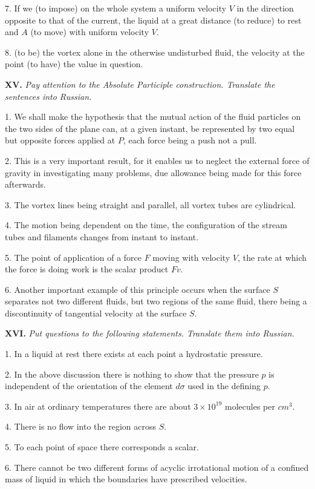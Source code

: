 \documentclass[a4paper]{article}
\newcommand{\ETask}[2]{\medskip\par\textbf{#1.} \textit{#2}\par}
\begin{document}
7. If we (to impose) on the whole system a uniform velocity $V$ in the direction opposite to that of the current, the liquid
at a great distance (to reduce) to rest and $A$ (to move) with uniform velocity $V$.

8. (to be) the vortex alone in the otherwise undisturbed fluid, the velocity at the point (to have) the value in question.

\ETask{XV}{Pay attention to the Absolute Participle construction. Translate the sentences into Russian.}
1. We shall make the hypothesis that the mutual action of the fluid particles on the two sides of the plane can, at a given
instant, be represented by two equal but opposite forces applied at $P$, each force being a push not a pull.

2. This is a very important result, for it enables us to neglect the external force of gravity in investigating many
problems, due allowance being made for this force afterwards.

3. The vortex lines being straight and parallel, all vortex tubes are cylindrical.

4. The motion being dependent on the time, the configuration of the stream tubes and filaments changes from instant to instant.

5. The point of application of a force $F$ moving with velocity $V$, the rate at which the force is doing work is the
scalar product $Fv$.

6. Another important example of this principle occurs when the surface $S$ separates not two different fluids, but two regions
of the same fluid, there being a discontinuity of tangential velocity at the surface $S$.

\ETask{XVI}{Put questions to the following statements. Translate them into Russian.}
1. In a liquid at rest there exists at each point a hydrostatic pressure.

2. In the above discussion there is nothing to show that the pressure $p$ is independent of the orientation of the element
$d \sigma$ used in the defining $p$.

3. In air at ordinary temperatures there are about $3 \times 10^{19}$ molecules per $cm^3$.

4. There is no flow into the region across $S$.

5. To each point of space there corresponds a scalar.

6. There cannot be two different forms of acyclic irrotational motion of a confined mass of liquid in which the boundaries
have prescribed velocities.
\end{document}
